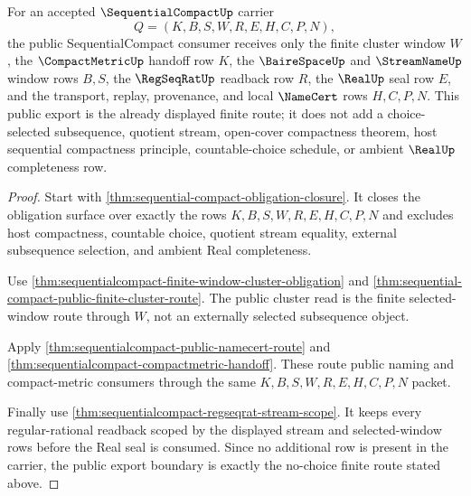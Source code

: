 \begin{theorem}
\label{thm:sequentialcompact-public-export}
For an accepted $\SequentialCompactUp$ carrier
$$
Q=(K,B,S,W,R,E,H,C,P,N),
$$
the public SequentialCompact consumer receives only the finite cluster window $W$, the $\CompactMetricUp$ handoff row $K$, the $\BaireSpaceUp$ and $\StreamNameUp$ window rows $B,S$, the $\RegSeqRatUp$ readback row $R$, the $\RealUp$ seal row $E$, and the transport, replay, provenance, and local $\NameCert$ rows $H,C,P,N$. This public export is the already displayed finite route; it does not add a choice-selected subsequence, quotient stream, open-cover compactness theorem, host sequential compactness principle, countable-choice schedule, or ambient $\RealUp$ completeness row.
\end{theorem}
\begin{proof}
Start with \autoref{thm:sequential-compact-obligation-closure}. It closes the obligation surface over exactly the rows $K,B,S,W,R,E,H,C,P,N$ and excludes host compactness, countable choice, quotient stream equality, external subsequence selection, and ambient Real completeness.

Use \autoref{thm:sequentialcompact-finite-window-cluster-obligation} and \autoref{thm:sequential-compact-public-finite-cluster-route}. The public cluster read is the finite selected-window route through $W$, not an externally selected subsequence object.

Apply \autoref{thm:sequentialcompact-public-namecert-route} and \autoref{thm:sequentialcompact-compactmetric-handoff}. These route public naming and compact-metric consumers through the same $K,B,S,W,R,E,H,C,P,N$ packet.

Finally use \autoref{thm:sequentialcompact-regseqrat-stream-scope}. It keeps every regular-rational readback scoped by the displayed stream and selected-window rows before the Real seal is consumed. Since no additional row is present in the carrier, the public export boundary is exactly the no-choice finite route stated above.
\end{proof}

